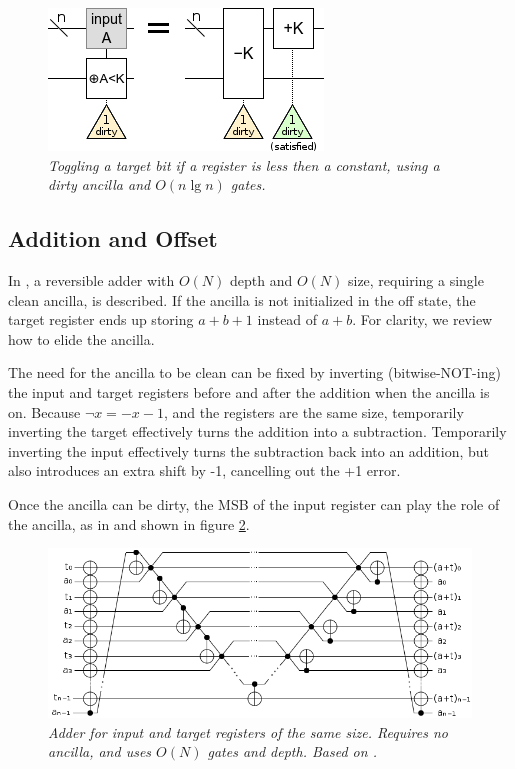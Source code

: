 \documentclass[twocolumn]{article}
\begin{document}
\begin{figure}
  \centering
  \includegraphics[width=\linewidth]{assets/comparison-less-const.png}
  \caption{\em Toggling a target bit if a register is less then a constant, using a dirty ancilla and $O(n \lg n)$ gates.}
  \label{fig:comparison-less-const}
\end{figure}


\subsection{Addition and Offset}

In \cite{van2004}, a reversible adder with $O(N)$ depth and $O(N)$ size, requiring a single clean ancilla, is described.
If the ancilla is not initialized in the off state, the target register ends up storing $a+b+1$ instead of $a+b$.
For clarity, we review how to elide the ancilla.

The need for the ancilla to be clean can be fixed by inverting (bitwise-NOT-ing) the input and target registers before and after the addition when the ancilla is on.
Because $\lnot x = -x-1$, and the registers are the same size, temporarily inverting the target effectively turns the addition into a subtraction.
Temporarily inverting the input effectively turns the subtraction back into an addition, but also introduces an extra shift by -1, cancelling out the +1 error.

Once the ancilla can be dirty, the MSB of the input register can play the role of the ancilla, as in \cite{takahashi2005} and shown in figure \ref{fig:inlineadder}.

\begin{figure}
  \centering
  \includegraphics[width=\linewidth]{assets/inline-adder.png}
  \caption{\em Adder for input and target registers of the same size.
  Requires no ancilla, and uses $O(N)$ gates and depth.
  Based on \cite{van2004, takahashi2005}.}
  \label{fig:inlineadder}
\end{figure}
\end{document}
